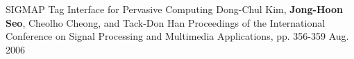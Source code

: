 \begin{cventries}
  \cvpublicationentry
    {SIGMAP} %
    {Tag Interface for Pervasive Computing} %
    {Dong-Chul Kim, \textbf{Jong-Hoon Seo}, Cheolho Cheong, and Tack-Don Han} %
    {Proceedings of the International Conference on Signal Processing and Multimedia Applications, pp. 356-359}
    {Aug. 2006} %
    {}
\end{cventries}







